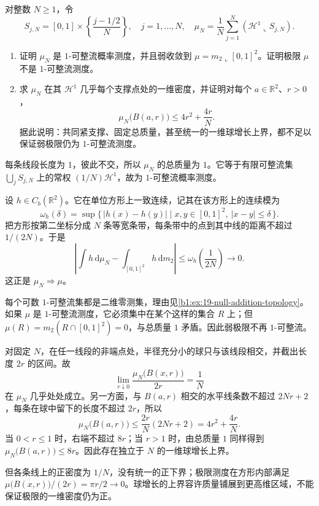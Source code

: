 \begin{optionalexercise}\label{b1:ex:19-rectifiable-weak-limit-dimension}
对整数 \(N\ge1\)，令
\[
 S_{j,N}=[0,1]\times\left\{\frac{j-1/2}{N}\right\},
 \quad j=1,\ldots,N,
 \quad \mu_N=\frac1N\sum_{j=1}^N(\mathcal H^1\llcorner S_{j,N}).
\]
\begin{enumerate}
\item\label{b1:item:19-grid-weak-limit}
证明 \(\mu_N\) 是 \(1\)-可整流概率测度，并且弱收敛到 \(\mu=m_2\llcorner[0,1]^2\)。证明极限 \(\mu\) 不是 \(1\)-可整流测度。
\item\label{b1:item:19-grid-density-bound}
求 \(\mu_N\) 在其 \(\mathcal H^1\) 几乎每个支撑点处的一维密度，并证明对每个 \(a\in\mathbb R^2\)、\(r>0\)，
\[
 \mu_N\bigl(B(a,r)\bigr)\le4r^2+\frac{4r}{N}.
\]
据此说明：共同紧支撑、固定总质量，甚至统一的一维球增长上界，都不足以保证弱极限仍为 \(1\)-可整流测度。
\end{enumerate}
\end{optionalexercise}
\begin{solution}
每条线段长度为 \(1\)，彼此不交，所以 \(\mu_N\) 的总质量为 \(1\)。它等于有限可整流集 \(\bigcup_jS_{j,N}\) 上的常权 \((1/N)\mathcal H^1\)，故为 \(1\)-可整流概率测度。

设 \(h\in C_b(\mathbb R^2)\)。它在单位方形上一致连续，记其在该方形上的连续模为
\[
 \omega_h(\delta)=\sup\{\,|h(x)-h(y)|\mid x,y\in[0,1]^2,\ |x-y|\le\delta\,\}.
\]
把方形按第二坐标分成 \(N\) 条等宽条带，每条带中的点到其中线的距离不超过 \(1/(2N)\)。于是
\[
 \left|\int h\,\mathrm d\mu_N-\int_{[0,1]^2}h\,\mathrm dm_2\right|
 \le\omega_h\left(\frac1{2N}\right)\longrightarrow0.
\]
这正是 \(\mu_N\Rightarrow\mu\)。

每个可数 \(1\)-可整流集都是二维零测集，理由见\cref{b1:ex:19-null-addition-topology}。如果 \(\mu\) 是 \(1\)-可整流测度，它必须集中在某个这样的集合 \(R\) 上；但 \(\mu(R)=m_2(R\cap[0,1]^2)=0\)，与总质量 \(1\) 矛盾。因此弱极限不再 \(1\)-可整流。

对固定 \(N\)，在任一线段的非端点处，半径充分小的球只与该线段相交，并截出长度 \(2r\) 的区间。故
\[
 \lim_{r\downarrow0}\frac{\mu_N\bigl(B(x,r)\bigr)}{2r}=\frac1N
\]
在 \(\mu_N\) 几乎处处成立。另一方面，与 \(B(a,r)\) 相交的水平线条数不超过 \(2Nr+2\)，每条在球中留下的长度不超过 \(2r\)，所以
\[
 \mu_N\bigl(B(a,r)\bigr)\le\frac{2r}{N}(2Nr+2)
 =4r^2+\frac{4r}{N}.
\]
当 \(0<r\le1\) 时，右端不超过 \(8r\)；当 \(r>1\) 时，由总质量 \(1\) 同样得到 \(\mu_N\bigl(B(a,r)\bigr)\le8r\)。因此存在独立于 \(N\) 的一维球增长上界。

但各条线上的正密度为 \(1/N\)，没有统一的正下界；极限测度在方形内部满足 \(\mu\bigl(B(x,r)\bigr)/(2r)=\pi r/2\to0\)。球增长的上界容许质量铺展到更高维区域，不能保证极限的一维密度仍为正。
\end{solution}
